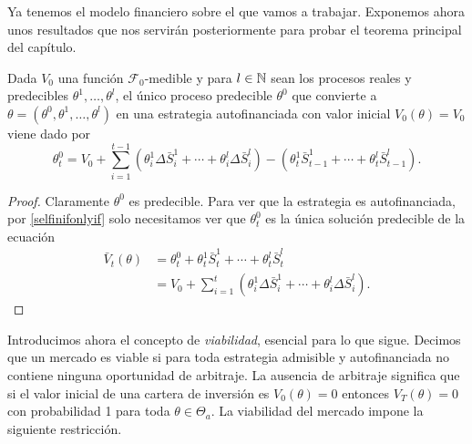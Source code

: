 Ya tenemos el modelo financiero sobre el que vamos a trabajar. Exponemos ahora unos resultados que nos servirán posteriormente para probar el teorema principal del capítulo.
\bigskip
\begin{lemaBox}\label{2.2.1}
	Dada $ V_0 $ una función $ \mathcal{F}_0 $-medible y para $ l \in \mathbb{N}  $ sean los procesos reales y predecibles $ \theta^1,\dots,\theta^l $, el único proceso predecible $ \theta^0 $ que convierte a $ \theta = (\theta^0,\theta^1,\dots,\theta^l) $ en una estrategia autofinanciada con valor inicial \nolinebreak$ V_0 (\theta)=$\nolinebreak$ V_0$  viene dado por
	\[
	\theta^0_t = V_0 + \sum_{i=1}^{t-1}(\theta^1_i\Delta\bar{S}^1_i+\cdots+\theta^l_i\Delta\bar{S}^l_i) - (\theta^1_t\bar{S}^1_{t-1}+\cdots+\theta^l_t\bar{S}^l_{t-1}).
	\]
\end{lemaBox}
\begin{proof}
	Claramente $ \theta^0 $ es predecible. Para ver que la estrategia es autofinanciada, por \eqref{selfinifonlyif} solo necesitamos ver que $ \theta^0_t $ es la única solución predecible de la ecuación 
	\begin{equation*}
	\begin{split}
	\bar{V}_t(\theta) &= \theta^0_t + \theta^1_t\bar{S}^1_t+\cdots+\theta^l_t\bar{S}^l_t \\
	&= V_0 + \sum_{i=1}^{t}(\theta^1_i\Delta\bar{S}^1_i+\cdots+\theta^l_i\Delta\bar{S}^l_i).
	\end{split}
	\end{equation*}
\end{proof}
\bigskip
Introducimos ahora el concepto de \textit{viabilidad}, esencial para lo que sigue. Decimos que un mercado es viable si para toda estrategia admisible y autofinanciada no contiene ninguna oportunidad de arbitraje. La ausencia de arbitraje significa que si el valor inicial de una cartera de inversión es $ V_0(\theta) = 0 $ entonces $ V_T(\theta) = 0 $ con probabilidad 1 para toda $ \theta \in\Theta_a $. La viabilidad del mercado impone la siguiente restricción.

